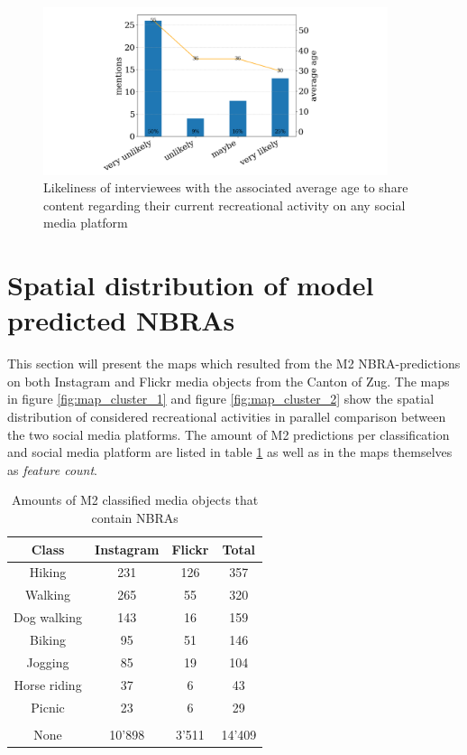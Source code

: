 \begin{figure}[h!]
   \centering
   \includegraphics[width=0.9\textwidth]{img/likeliness_to_share_SMD.pdf}
   \caption{Likeliness of interviewees with the associated average age to share content regarding their current recreational activity on any social media platform}
   \label{fig:likeliness_to_share_SMD}
\end{figure}

\section{Spatial distribution of model predicted NBRAs} \label{results_spatial_dist_model_NBRA}
This section will present the maps which resulted from the M2 NBRA-predictions on both Instagram and Flickr media objects from the Canton of Zug. The maps in figure \ref{fig:map_cluster_1} and figure \ref{fig:map_cluster_2} show the spatial distribution of considered recreational activities in parallel comparison between the two social media platforms. The amount of M2 predictions per classification and social media platform are listed in table \ref{tab:amount_class_NBRAs} as well as in the maps themselves as \textit{feature count}.

\begin{table}[h!]
\begin{center}
\caption{Amounts of M2 classified media objects that contain NBRAs}\vspace{1ex}
\label{tab:amount_class_NBRAs}
\begin{tabular}{cccc}\hline
Class & Instagram & Flickr & Total\\ \hline
Hiking & 231 & 126 & 357\\
Walking & 265 & 55 & 320\\
Dog walking & 143 & 16 & 159\\
Biking & 95 & 51 & 146\\
Jogging & 85 & 19 & 104\\
Horse riding & 37 & 6 & 43\\
Picnic & 23 & 6 & 29\\
 & & & \\
None & 10'898 & 3'511 & 14'409\\
\hline
\end{tabular}
\end{center}
\end{table}

